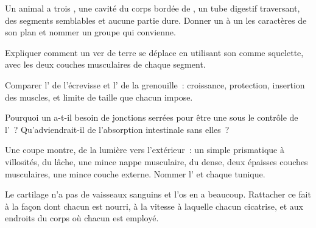 \begin{exercise}[$\star\star$]\label{exo:b1:body-plans-tissues:5}
Un animal a trois , une cavité du corps bordée de
, un tube digestif traversant, des segments semblables et
aucune partie dure. Donner un à un les caractères de son plan et nommer
un groupe qui convienne.
\end{exercise}

\begin{exercise}[$\star\star$]\label{exo:b1:body-plans-tissues:6}
Expliquer comment un ver de terre se déplace en utilisant son 
comme squelette, avec les deux couches musculaires de chaque segment.
\end{exercise}

\begin{exercise}[$\star\star$]\label{exo:b1:body-plans-tissues:7}
Comparer l' de l'écrevisse et l' de la
grenouille~: croissance, protection, insertion des muscles, et limite de
taille que chacun impose.
\end{exercise}

\begin{exercise}[$\star\star$]\label{exo:b1:body-plans-tissues:8}
Pourquoi un  a-t-il besoin de jonctions serrées pour être une
 sous le contrôle de l'~? Qu'adviendrait-il
de l'absorption intestinale sans elles~?
\end{exercise}

\begin{exercise}[$\star\star$]\label{exo:b1:body-plans-tissues:9}
Une coupe montre, de la lumière vers l'extérieur~: un  simple
prismatique à villosités, du  lâche, une mince nappe
musculaire, du  dense, deux épaisses couches
musculaires, une mince couche externe. Nommer l' et chaque
tunique.
\end{exercise}

\begin{exercise}[$\star\star\star$]\label{exo:b1:body-plans-tissues:10}
Le cartilage n'a pas de vaisseaux sanguins et l'os en a beaucoup.
Rattacher ce fait à la façon dont chacun est nourri, à la vitesse à
laquelle chacun cicatrise, et aux endroits du corps où chacun est
employé.
\end{exercise}

